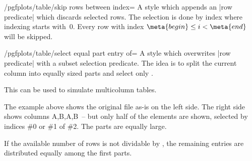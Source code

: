 \begin{stylekey}{/pgfplots/table/skip rows between index=}
	A style which appends an |row predicate| which discards selected rows. The selection is done by index where indexing starts with~$0$. Every row with index $\meta{begin} \le i < \meta{end}$ will be skipped.
\begin{codeexample}[width=7cm]
\end{codeexample}
\end{stylekey}

\begin{stylekey}{/pgfplots/table/select equal part entry of=}
	A style which overwrites |row predicate| with a subset selection predicate. The idea is to split the current column into  equally sized parts and select only .

	This can be used to simulate multicolumn tables.
\begin{codeexample}[]


\end{codeexample}
	The example above shows the original file as-is on the left side. The right side shows columns A,B,A,B~-- but only half of the elements are shown, selected by indices \#0 or \#1 of \#2. The parts are equally large. 
	
	If the available number of rows is not dividable by , the remaining entries are distributed equally among the first parts.
\end{stylekey}

